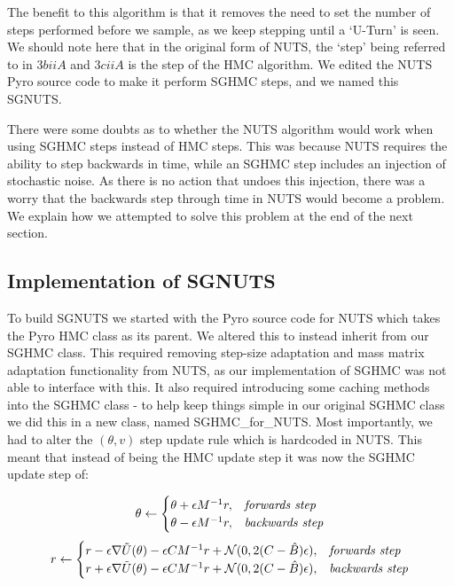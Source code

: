 The benefit to this algorithm is that it removes the need to set the number of steps performed before we sample, as we keep stepping until a `U-Turn' is seen. We should note here that in the original form of NUTS, the `step' being referred to in $3biiA$ and $3ciiA$ is the step of the HMC algorithm. We edited the NUTS Pyro source code to make it perform SGHMC steps, and we named this SGNUTS.

There were some doubts as to whether the NUTS algorithm would work when using SGHMC steps instead of HMC steps. This was because NUTS requires the ability to step backwards in time, while an SGHMC step includes an injection of stochastic noise. As there is no action that undoes this injection, there was a worry that the backwards step through time in NUTS would become a problem. We explain how we attempted to solve this problem at the end of the next section.


\subsection{Implementation of SGNUTS}

To build SGNUTS we started with the Pyro source code for NUTS \cite{nuts_code} which takes the Pyro HMC class as its parent. We altered this to instead inherit from our SGHMC class. This required removing step-size adaptation and mass matrix adaptation functionality from NUTS, as our implementation of SGHMC was not able to interface with this. It also required introducing some caching methods into the SGHMC class - to help keep things simple in our original SGHMC class we did this in a new class, named SGHMC\_for\_NUTS. Most importantly, we had to alter the $(\theta,v)$ step update rule which is hardcoded in NUTS. This meant that instead of being the HMC update step it was now the SGHMC update step of:

$$
    \theta \leftarrow 
    \begin{cases}\theta + \epsilon M^{-1}r, & \text{{\textit{forwards step}}}\\
                \theta - \epsilon M^{-1}r,  & \text{{\textit{backwards step}}}

\end{cases}
$$
$$
    r \leftarrow 
    \begin{cases}
                
    r - \epsilon \nabla \tilde{U}(\theta) - \epsilon C M^{-1}r + \mathcal{N}(0,2(C-\hat{B})\epsilon), & \text{{\textit{forwards step}}}\\
   
    r + \epsilon \nabla \tilde{U}(\theta) - \epsilon C M^{-1}r + \mathcal{N}(0,2(C-\hat{B})\epsilon), & \text{{\textit{backwards step}}}\\
 \end{cases}
    $$

